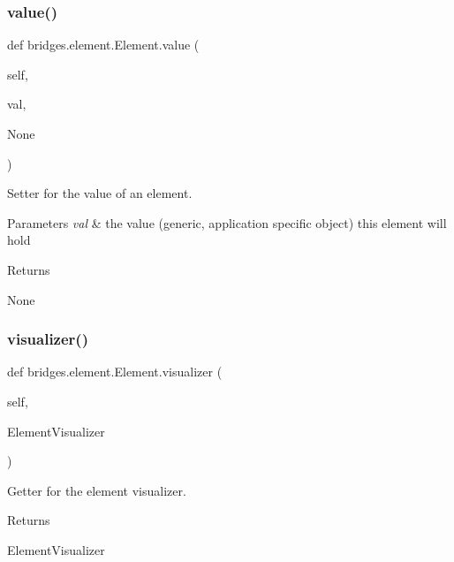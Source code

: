 \subsubsection{\texorpdfstring{value()}{value()}\hspace{0.1cm}{\footnotesize\ttfamily [2/2]}}
{\footnotesize\ttfamily def bridges.\+element.\+Element.\+value (\begin{DoxyParamCaption}\item[{}]{self,  }\item[{}]{val,  }\item[{}]{None }\end{DoxyParamCaption})}



Setter for the value of an element. 


\begin{DoxyParams}{Parameters}
{\em val} & the value (generic, application specific object) this element will hold \\
\hline
\end{DoxyParams}
\begin{DoxyReturn}{Returns}


None 
\end{DoxyReturn}
\mbox{\label{classbridges_1_1element_1_1_element_a727ec3cb97aeb68fec4cb456535f6763}} 
\subsubsection{\texorpdfstring{visualizer()}{visualizer()}\hspace{0.1cm}{\footnotesize\ttfamily [1/2]}}
{\footnotesize\ttfamily def bridges.\+element.\+Element.\+visualizer (\begin{DoxyParamCaption}\item[{}]{self,  }\item[{}]{Element\+Visualizer }\end{DoxyParamCaption})}



Getter for the element visualizer. 

\begin{DoxyReturn}{Returns}


Element\+Visualizer 
\end{DoxyReturn}
\mbox{\label{classbridges_1_1element_1_1_element_a38aad89ce4b1e01cb9f548cac4313077}} 
